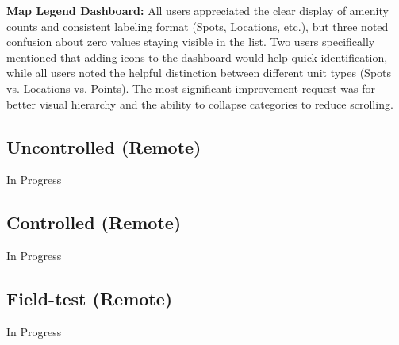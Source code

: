 \documentclass{report}
\begin{document}
\textbf{Map Legend Dashboard: }
All users appreciated the clear display of amenity counts and consistent labeling format (Spots, Locations, etc.), but three  noted confusion about zero values staying visible in the list. Two users specifically mentioned that adding icons to the dashboard would help quick identification, while all users noted the helpful distinction between different unit types (Spots vs. Locations vs. Points). The most significant improvement request was for better visual hierarchy and the ability to collapse categories to reduce scrolling. \\

\subsection{Uncontrolled (Remote)}
In Progress
\subsection{Controlled (Remote)}
In Progress
\subsection{Field-test (Remote)}
In Progress
\end{document}

